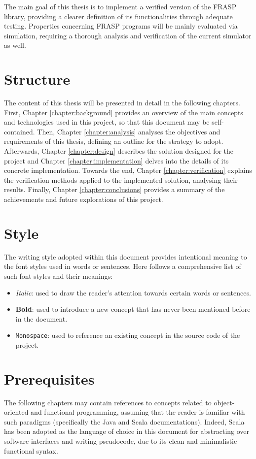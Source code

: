 The main goal of this thesis is to implement a verified version of the FRASP
library, providing a clearer definition of its functionalities through adequate
testing. Properties concerning FRASP programs will be mainly evaluated via
simulation, requiring a thorough analysis and verification of the current
simulator as well.

\section{Structure}
\label{section:introduction:structure}

The content of this thesis will be presented in detail in the following
chapters. First, Chapter \ref{chapter:background} provides an overview of the
main concepts and technologies used in this project, so that this document may
be self-contained. Then, Chapter \ref{chapter:analysis} analyses the objectives
and requirements of this thesis, defining an outline for the strategy to adopt.
Afterwards, Chapter \ref{chapter:design} describes the solution designed for
the project and Chapter \ref{chapter:implementation} delves into the details of
its concrete implementation. Towards the end, Chapter
\ref{chapter:verification} explains the verification methods applied to the
implemented solution, analysing their results. Finally, Chapter
\ref{chapter:conclusions} provides a summary of the achievements and future
explorations of this project.

\section{Style}
\label{section:introduction:style}

The writing style adopted within this document provides intentional meaning to
the font styles used in words or sentences. Here follows a comprehensive list
of such font styles and their meanings:

\begin{itemize}
  \item \textit{Italic}: used to draw the reader's attention towards certain
        words or sentences.
  \item \textbf{Bold}: used to introduce a new concept that has never been
        mentioned before in the document.
  \item \texttt{Monospace}: used to reference an existing concept in the source
        code of the project.
\end{itemize}

\section{Prerequisites}
\label{section:introduction:prerequisites}

The following chapters may contain references to concepts related to
object-orient\-ed and functional programming, assuming that the reader is
familiar with such paradigms (specifically the Java \cite{Java} and Scala
\cite{Scala} documentations). Indeed, Scala has been adopted as the language of
choice in this document for abstracting over software interfaces and writing
pseudocode, due to its clean and minimalistic functional syntax.
